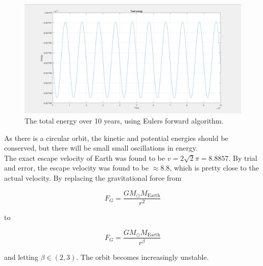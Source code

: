 \documentclass[10pt,a4paper]{article}
\begin{document}
\begin{figure} [H]

\centerline{\includegraphics[scale=0.30]{TotalEnergyVerlet.png}}
\caption{The total energy over 10 years, using Eulers forward algorithm. }


\end{figure}

\noindent As there is a circular orbit, the kinetic and potential energies should be conserved, but there will be small small oscillations in energy.\\



\noindent The exact escape velocity of Earth was found to be $v=2\sqrt{2}\pi=8.8857$. By trial and error, the escape velocity was found to be $\approx 8.8$, which is pretty close to the actual velocity. By replacing the gravitational force from

$$
F_G=\frac{GM_{\odot}M_{\mathrm{Earth}}}{r^2}
$$

to

$$
F_G=\frac{GM_{\odot}M_{\mathrm{Earth}}}{r^{\beta}}
$$

\noindent and letting $\beta\in(2,3)$. The orbit becomes increasingly unstable.\\
\end{document}
